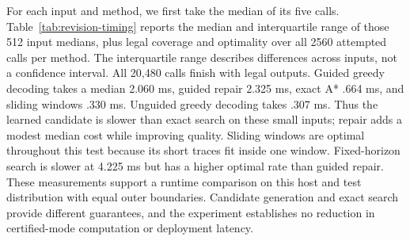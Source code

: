 \begin{revised}
For each input and method, we first take the median of its five calls. Table~\ref{tab:revision-timing} reports the median and interquartile range of those 512 input medians, plus legal coverage and optimality over all 2560 attempted calls per method. The interquartile range describes differences across inputs, not a confidence interval. All 20,480 calls finish with legal outputs. Guided greedy decoding takes a median 2.060 ms, guided repair 2.325 ms, exact A* .664 ms, and sliding windows .330 ms. Unguided greedy decoding takes .307 ms. Thus the learned candidate is slower than exact search on these small inputs; repair adds a modest median cost while improving quality. Sliding windows are optimal throughout this test because its short traces fit inside one window. Fixed-horizon search is slower at 4.225 ms but has a higher optimal rate than guided repair. These measurements support a runtime comparison on this host and test distribution with equal outer boundaries. Candidate generation and exact search provide different guarantees, and the experiment establishes no reduction in certified-mode computation or deployment latency.
\end{revised}
